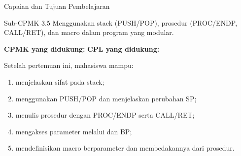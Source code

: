 \documentclass[aspectratio=169,11pt]{beamer}
\begin{document}

\begin{frame}{Capaian dan Tujuan Pembelajaran}
\begin{block}{Sub-CPMK 3.5}
\footnotesize Menggunakan stack (PUSH/POP), prosedur
(PROC/ENDP, CALL/RET), dan macro dalam program yang modular.
\end{block}

\vspace{0.1em}
{\small\textbf{CPMK yang didukung:} \quad\textbullet\quad
\textbf{CPL yang didukung:} \par}

\vspace{0.15em}
\begin{exampleblock}{Setelah pertemuan ini, mahasiswa mampu:}
\footnotesize
\begin{enumerate}
    \item menjelaskan sifat  pada stack;
    \item menggunakan PUSH/POP dan menjelaskan perubahan SP;
    \item menulis prosedur dengan PROC/ENDP serta CALL/RET;
    \item mengakses parameter melalui  dan BP;
    \item mendefinisikan macro berparameter dan membedakannya dari
          prosedur.
\end{enumerate}
\end{exampleblock}
\end{frame}
\end{document}
